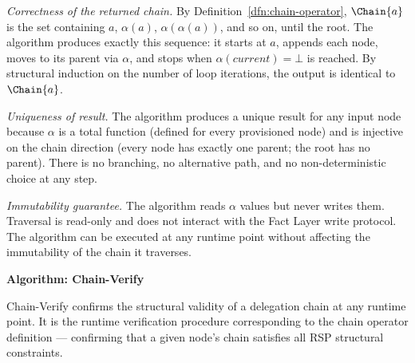 \textit{Correctness of the returned chain.} By Definition~\ref{dfn:chain-operator}, $\Chain{a}$ is the set containing $a$, $\alpha(a)$, $\alpha(\alpha(a))$, and so on, until the root. The algorithm produces exactly this sequence: it starts at $a$, appends each node, moves to its parent via $\alpha$, and stops when $\alpha(current) = \bot$ is reached. By structural induction on the number of loop iterations, the output is identical to $\Chain{a}$.

\textit{Uniqueness of result.} The algorithm produces a unique result for any input node because $\alpha$ is a total function (defined for every provisioned node) and is injective on the chain direction (every node has exactly one parent; the root has no parent). There is no branching, no alternative path, and no non-deterministic choice at any step.

\textit{Immutability guarantee.} The algorithm reads $\alpha$ values but never writes them. Traversal is read-only and does not interact with the Fact Layer write protocol. The algorithm can be executed at any runtime point without affecting the immutability of the chain it traverses.

\medskip
\noindent\textbf{Algorithm: Chain-Verify}

Chain-Verify confirms the structural validity of a delegation chain at any runtime point. It is the runtime verification procedure corresponding to the chain operator definition — confirming that a given node's chain satisfies all RSP structural constraints.

